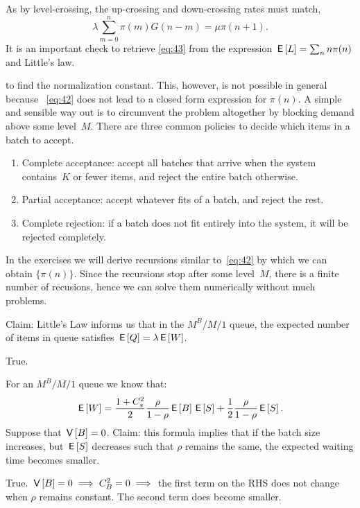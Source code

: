\documentclass[stochastic-or.tex]{subfiles}
\begin{document}
As by level-crossing, the up-crossing and down-crossing rates must match,
\begin{equation}\label{eq:42}
\lambda \sum_{m=0}^n \pi(m) G(n-m) = \mu \pi(n+1).
\end{equation}
It is an important check to retrieve \cref{eq:43} from the expression $\,\mathsf{E}\left[L\right] = \sum_{n} n \pi(n)$ and Little's law.

 to find the normalization constant.
This, however, is not possible in general because ~\cref{eq:42} does not lead to a closed form expression for $\pi(n)$.
A simple and sensible way out is to circumvent the problem altogether by blocking demand above some level~$M$.
There are three common policies to decide which items in a batch to accept.
\begin{enumerate}
\item Complete acceptance: accept all batches that arrive when the system contains~$K$ or fewer items, and reject the entire batch otherwise.
\item Partial acceptance: accept whatever fits of a batch, and reject the rest.
\item Complete rejection: if a batch does not fit entirely into the system, it will be rejected completely.
\end{enumerate}
In the exercises we will derive recursions similar to~\cref{eq:42} by which we can obtain $\{\pi(n)\}$.
Since the recursions stop after some level~$M$, there is a finite number of recusions, hence we can solve them numerically without much problems.


\begin{truefalse}
Claim:   Little's Law informs us that in the $M^{B}/M/1$ queue, the expected number of items in queue satisfies $\,\mathsf{E}\left[Q\right]=\lambda\,\mathsf{E}\left[W\right]$.
\begin{solution}
        True.
\end{solution}
\end{truefalse}

\begin{truefalse}
    For an $M^B/M/1$ queue we know that:
    $$
    \,\mathsf{E}\left[W\right]=\frac{1+C_s^2}{2}\frac{\rho}{1-\rho}\,\mathsf{E}\left[B\right]\,\mathsf{E}\left[S\right]+\frac{1}{2}\frac{\rho}{1-\rho}\,\mathsf{E}\left[S\right].
    $$
    Suppose that $\,\mathsf{V}\left[B\right] = 0$.
    Claim: this formula implies that if the batch size increases, but $\,\mathsf{E}\left[S\right]$ decreases such that $\rho$ remains the same, the expected waiting time becomes smaller.

\begin{solution}
        True. $\,\mathsf{V}\left[B\right] = 0 \implies C_{B}^{2} = 0 \implies$ the first term on the RHS does not change when $\rho$ remains constant. The second term does become smaller.
\end{solution}
\end{truefalse}
\end{document}
